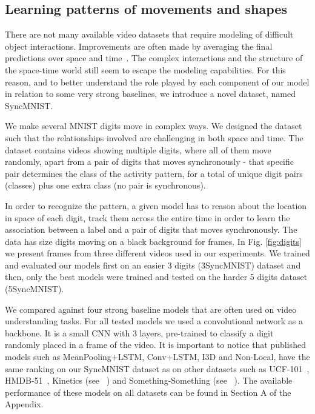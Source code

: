\documentclass{article}
\begin{document}
\subsection{Learning patterns of movements and shapes}


There are not many available video datasets that require modeling of difficult object interactions. Improvements are often made by averaging the final predictions over space and time~\cite{chen20182_a2nets}. The complex interactions and the structure of the space-time world still seem to escape the modeling capabilities. For this reason, and to better understand the role played by each component of our model in relation to some very strong baselines, we introduce a novel dataset, named SyncMNIST.

We make several MNIST digits move  in complex ways. We designed the dataset such that the relationships involved are challenging in both space and time. The dataset contains  videos showing multiple digits, where all of them move randomly, apart from a pair of digits that moves synchronously - that specific pair determines the class of the activity pattern, for a total of  unique digit pairs (classes) plus one extra class (no pair is synchronous).

In order to recognize the pattern, a given model has to reason about the location in space of each digit, track them across the entire time in order to learn the association between a label and a pair of digits that moves synchronously. The data has  size digits moving on a black  background for  frames. In Fig. \ref{fig:digits} we present frames from three different videos used in our experiments. We trained and evaluated our models first on an easier 3 digits (3SyncMNIST) dataset and then, only the best models were trained and tested on the harder 5 digits dataset (5SyncMNIST).

 We compared against four strong baseline models that are often used on video understanding tasks. For all tested models we used a convolutional network as a backbone. It is a small CNN with 3 layers, pre-trained to classify a digit randomly placed in a frame of the video. It is important to notice that published models such as MeanPooling+LSTM, Conv+LSTM, I3D and Non-Local, have the same ranking on our SyncMNIST dataset as on other datasets such as UCF-101~\cite{soomro2012ucf101},  HMDB-51~\cite{kuehne2011hmdb}, Kinetics (see ~\cite{carreira2017quo}) and Something-Something (see  ~\cite{wang2018videos_gupta2}). The available performance of these models on all datasets can be found in Section A of the Appendix.  
\end{document}
